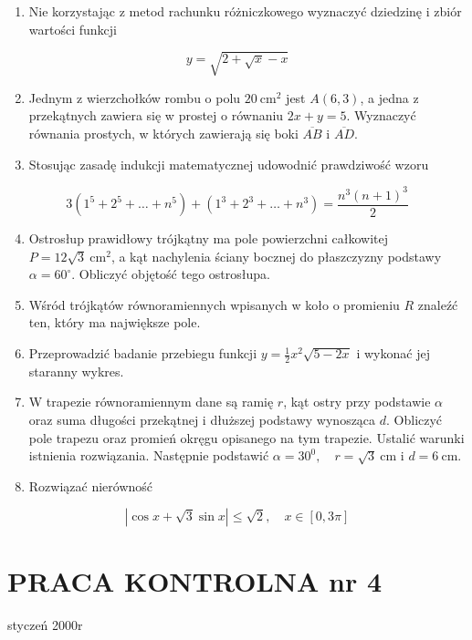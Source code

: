 \documentclass[10pt]{article}
\begin{document}
\begin{enumerate}
  \item Nie korzystając z metod rachunku różniczkowego wyznaczyć dziedzinę i zbiór wartości funkcji
\end{enumerate}

$$
y=\sqrt{2+\sqrt{x}-x}
$$

\begin{enumerate}
  \setcounter{enumi}{1}
  \item Jednym z wierzchołków rombu o polu $20 \mathrm{~cm}^{2}$ jest $A(6,3)$, a jedna z przekątnych zawiera się w prostej o równaniu $2 x+y=5$. Wyznaczyć równania prostych, w których zawierają się boki $\overline{A B}$ i $\overline{A D}$.
  \item Stosując zasadę indukcji matematycznej udowodnić prawdziwość wzoru
\end{enumerate}

$$
3\left(1^{5}+2^{5}+\ldots+n^{5}\right)+\left(1^{3}+2^{3}+\ldots+n^{3}\right)=\frac{n^{3}(n+1)^{3}}{2}
$$

\begin{enumerate}
  \setcounter{enumi}{3}
  \item Ostrosłup prawidłowy trójkątny ma pole powierzchni całkowitej $P=12 \sqrt{3} \mathrm{~cm}^{2}$, a kąt nachylenia ściany bocznej do płaszczyzny podstawy $\alpha=60^{\circ}$. Obliczyć objętość tego ostrosłupa.
  \item Wśród trójkątów równoramiennych wpisanych w koło o promieniu $R$ znaleźć ten, który ma największe pole.
  \item Przeprowadzić badanie przebiegu funkcji $y=\frac{1}{2} x^{2} \sqrt{5-2 x}$ i wykonać jej staranny wykres.
  \item W trapezie równoramiennym dane są ramię $r$, kąt ostry przy podstawie $\alpha$ oraz suma długości przekątnej i dłuższej podstawy wynosząca $d$. Obliczyć pole trapezu oraz promień okręgu opisanego na tym trapezie. Ustalić warunki istnienia rozwiązania. Następnie podstawić $\alpha=30^{0}, \quad r=\sqrt{3} \mathrm{~cm}$ i $d=6 \mathrm{~cm}$.
  \item Rozwiązać nierówność
\end{enumerate}

$$
|\cos x+\sqrt{3} \sin x| \leqslant \sqrt{2}, \quad x \in[0,3 \pi]
$$

\section*{PRACA KONTROLNA nr 4}
styczeń 2000r
\end{document}
